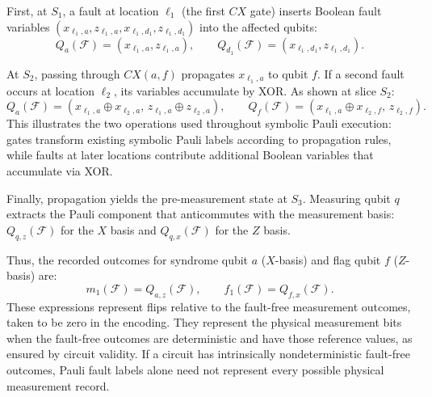 \documentclass[acmsmall,screen,review,anonymous,nonacm]{acmart}
\begin{document}
First, at $S_1$, a fault at location $\ell_1$ (the first $CX$ gate) inserts Boolean fault variables $(x_{\ell_1,a}, z_{\ell_1,a}, x_{\ell_1,d_1}, z_{\ell_1,d_1})$ into the affected qubits:
\[
Q_a(\mathcal{F})=(x_{\ell_1,a},z_{\ell_1,a}), \qquad Q_{d_1}(\mathcal{F})=(x_{\ell_1,d_1},z_{\ell_1,d_1}).
\]

At $S_2$, passing through $CX(a,f)$ propagates $x_{\ell_1,a}$ to qubit $f$. If a second fault occurs at location $\ell_2$, its variables accumulate by XOR. As shown at slice $S_2$:
\[
Q_a(\mathcal{F}) = (x_{\ell_1,a}\oplus x_{\ell_2,a},\, z_{\ell_1,a}\oplus z_{\ell_2,a}), \qquad Q_f(\mathcal{F}) = (x_{\ell_1,a}\oplus x_{\ell_2,f},\, z_{\ell_2,f}).
\]
This illustrates the two operations used throughout symbolic Pauli execution: gates transform existing symbolic Pauli labels according to propagation rules, while faults at later locations contribute additional Boolean variables that accumulate via XOR.



Finally, propagation yields the pre-measurement state at $S_3$. Measuring qubit $q$ extracts the Pauli component that anticommutes with the measurement basis: $Q_{q,z}(\mathcal{F})$ for the $X$ basis and $Q_{q,x}(\mathcal{F})$ for the $Z$ basis.

Thus, the recorded outcomes for syndrome qubit $a$ ($X$-basis) and flag qubit $f$ ($Z$-basis) are:
\[
m_1(\mathcal{F}) = Q_{a,z}(\mathcal{F}), \qquad f_1(\mathcal{F}) = Q_{f,x}(\mathcal{F}).
\]
These expressions represent flips relative to the fault-free
measurement outcomes, taken to be zero in the encoding. They represent
the physical measurement bits when the fault-free outcomes are
deterministic and have those reference values, as ensured by circuit
validity. If a circuit has intrinsically nondeterministic fault-free
outcomes, Pauli fault labels alone need not represent every possible
physical measurement record.
\end{document}
